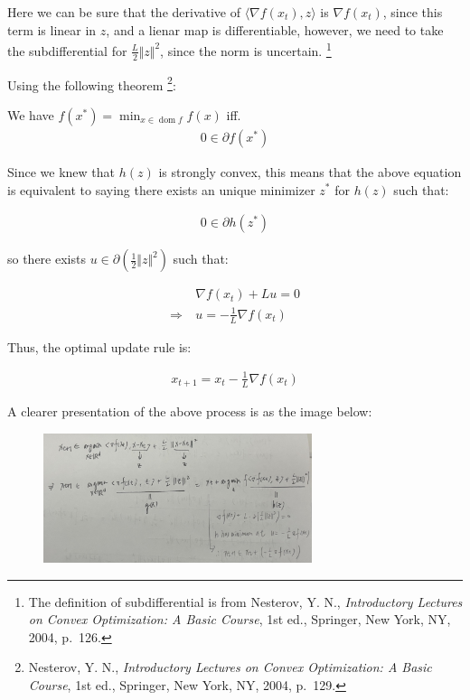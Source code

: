 \documentclass{article}
\DeclareMathOperator{\domain}{dom}
\begin{document}
Here we can be sure that the derivative of $\langle \nabla f(x_t), z \rangle$ is $\nabla f(x_t)$, since this term is linear in $z$, 
and a lienar map is differentiable, however, we need to take the subdifferential for $\frac{L}{2} \Vert z \Vert^2$, since the norm is uncertain.
\footnote{The definition of subdifferential is from Nesterov, Y. N., \textit{Introductory Lectures on Convex Optimization: A Basic Course}, 1st ed., Springer, New York, NY, 2004, p.~126.}
\bigskip

Using the following theorem
\footnote{Nesterov, Y. N., \textit{Introductory Lectures on Convex Optimization: A Basic Course}, 1st ed., Springer, New York, NY, 2004, p.~129.}:

\begin{tcolorbox}[greenbox, title = Theorem 3.1.15]
    We have $f(x^*) = \min_{x \in \domain f} f(x)$ iff.
    \begin{align*}
        0 \in \partial f(x^*)
    \end{align*}
\end{tcolorbox}

Since we knew that $h(z)$ is strongly convex, 
this means that the above equation is equivalent to saying 
there exists an unique minimizer $z^*$ for $h(z)$ such that:

\begin{align*}
    0 \in \partial h(z^*)
\end{align*}

so there exists $u \in \partial (\frac{1}{2} \Vert z \Vert^2)$ such that:

\begin{align*}
    &\nabla f(x_t) + Lu = 0 \\
    \Rightarrow \ &u = - \frac{1}{L} \nabla f(x_t)
\end{align*}

Thus, the optimal update rule is:

\begin{align*}
    x_{t+1} = x_t - \frac{1}{L} \nabla f(x_t)
\end{align*}

A clearer presentation of the above process is as the image below:

\begin{figure}[H]
    \centering
    \includegraphics[width=0.7\textwidth]{HW1_images/4_(2).jpg}
\end{figure}
\end{document}
